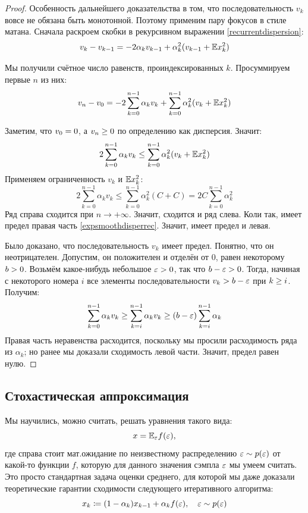 \begin{theoremBox}[label=th:expsmoothingconvergence]{}
\begin{proof}
Особенность дальнейшего доказательства в том, что последовательность $v_k$ вовсе не обязана быть монотонной. Поэтому применим пару фокусов в стиле матана. Сначала раскроем скобки в рекурсивном выражении \eqref{recurrentdispersion}:
$$v_{k} - v_{k-1} = - 2\alpha_k v_{k-1} + \alpha_k^2 (v_{k-1} + \mathbb{E} x_k^2)$$

Мы получили счётное число равенств, проиндексированных $k$. Просуммируем первые $n$ из них:
\begin{equation}\label{expsmoothdisperrec}
v_{n} - v_0 = - 2 \sum_{k = 0}^{n-1} \alpha_k v_k + \sum_{k = 0}^{n-1} \alpha_k^2 (v_k + \mathbb{E} x_k^2)
\end{equation}

Заметим, что $v_0 \HM= 0$, а $v_{n} \HM\ge 0$ по определению как дисперсия. Значит: 
$$2 \sum_{k = 0}^{n-1} \alpha_k v_k \le \sum_{k = 0}^{n-1} \alpha_k^2 (v_k + \mathbb{E} x_k^2)$$
Применяем ограниченность $v_k$ и $\mathbb{E} x_k^2$:
$$2 \sum_{k = 0}^{n-1} \alpha_k v_k \le \sum_{k = 0}^{n-1} \alpha_k^2 (C + C) = 2C \sum_{k = 0}^{n-1} \alpha_k^2$$
Ряд справа сходится при $n \to +\infty$. Значит, сходится и ряд слева. Коли так, имеет предел правая часть \eqref{expsmoothdisperrec}. Значит, имеет предел и левая.

Было доказано, что последовательность $v_k$ имеет предел. Понятно, что он неотрицателен. Допустим, он положителен и отделён от 0, равен некоторому $b \HM> 0$. Возьмём какое-нибудь небольшое $\eps \HM> 0$, так что $b \HM- \eps \HM> 0$. Тогда, начиная с некоторого номера $i$ все элементы последовательности $v_k \HM> b \HM- \eps$ при $k \HM\ge i$. Получим:
$$\sum_{k = 0}^{n-1} \alpha_k v_k \ge \sum_{k = i}^{n-1} \alpha_k v_k \ge (b - \varepsilon) \sum_{k = i}^{n-1} \alpha_k$$
Правая часть неравенства расходится, поскольку мы просили расходимость ряда из $\alpha_k$; но ранее мы доказали сходимость левой части. Значит, предел равен нулю.
\end{proof}
\end{theoremBox}


\subsection{Стохастическая аппроксимация}

Мы научились, можно считать, решать уравнения такого вида:
$$x = \mathbb{E}_{\varepsilon} f(\varepsilon),$$
где справа стоит мат.ожидание по неизвестному распределению $\varepsilon \sim p(\varepsilon)$ от какой-то функции $f$, которую для данного значения сэмпла $\varepsilon$ мы умеем считать. Это просто стандартная задача оценки среднего, для которой мы даже доказали теоретические гарантии сходимости следующего итеративного алгоритма:
$$x_k \coloneqq (1 - \alpha_k)x_{k-1} + \alpha_k f(\varepsilon), \quad \varepsilon \sim p(\varepsilon)$$

